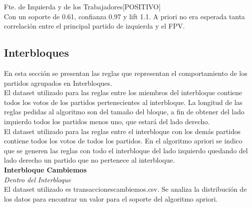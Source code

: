 \documentclass{endm}
\begin{document}
{Fte. de Izquierda y de los Trabajadores[POSITIVO]} \\

Con un soporte de 0.61, confianza 0.97 y lift 1.1. A priori no era esperada tanta correlación entre el principal partido de izquierda y el FPV. \\


\subsection{Interbloques}

En esta sección se presentan las reglas que representan el comportamiento de los partidos agrupados en Interbloques.\\

El dataset utilizado para las reglas entre los miembros del interbloque contiene todos los votos de los partidos pertenecientes al interbloque. La longitud de las reglas pedidas al algoritmo son del tamaño del bloque, a fin de obtener del lado izquierdo todos los partidos menos uno, que estará del lado derecho.\\

El dataset utilizado para las reglas entre el interbloque con los demás partidos contiene todos los votos de todos los partidos. En el algoritmo apriori se indico que se generen las reglas con todo el interbloque del lado izquierdo quedando del lado derecho un partido que no pertenece al interbloque. \\

\textbf{Interbloque Cambiemos}\\

\textit{Dentro del Interbloque} \\

El dataset utilizado es transaccionescambiemos.csv. Se analiza la distribución de los datos para encontrar un valor para el soporte del algoritmo apriori. \\
\end{document}
